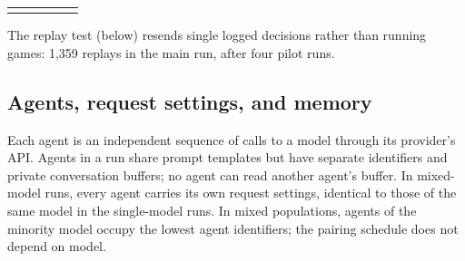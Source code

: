 \begin{table}[t]
\begin{tabular}{p{0.3\linewidth}p{0.52\linewidth}r}
\addlinespace
\bottomrule
\end{tabular}
\end{table}

The replay test (below) resends single logged decisions rather than running games: 1,359 replays in the main run, after four pilot runs.

\subsection{Agents, request settings, and memory}
\label{sec:protocol-agents}

Each agent is an independent sequence of calls to a model through its provider's API. Agents in a run share prompt templates but have separate identifiers and private conversation buffers; no agent can read another agent's buffer. In mixed-model runs, every agent carries its own request settings, identical to those of the same model in the single-model runs. In mixed populations, agents of the minority model occupy the lowest agent identifiers; the pairing schedule does not depend on model.

